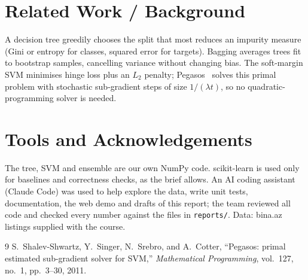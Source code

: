 \documentclass[10pt,twocolumn,a4paper]{article}
\begin{document}
\section{Related Work / Background}
A decision tree greedily chooses the split that most reduces an impurity measure (Gini or entropy for classes, squared error for targets). Bagging averages trees fit to bootstrap samples, cancelling variance without changing bias. The soft-margin SVM minimises hinge loss plus an $L_2$ penalty; Pegasos~\cite{pegasos} solves this primal problem with stochastic sub-gradient steps of size $1/(\lambda t)$, so no quadratic-programming solver is needed.







\section*{Tools and Acknowledgements}
The tree, SVM and ensemble are our own NumPy code. scikit-learn is used only for baselines and correctness checks, as the brief allows. An AI coding assistant (Claude Code) was used to help explore the data, write unit tests, documentation, the web demo and drafts of this report; the team reviewed all code and checked every number against the files in \texttt{reports/}. Data: bina.az listings supplied with the course.

\begin{thebibliography}{9}
S.~Shalev-Shwartz, Y.~Singer, N.~Srebro, and A.~Cotter,
``Pegasos: primal estimated sub-gradient solver for SVM,''
\emph{Mathematical Programming}, vol.~127, no.~1, pp.~3--30, 2011.
\end{thebibliography}
\end{document}
